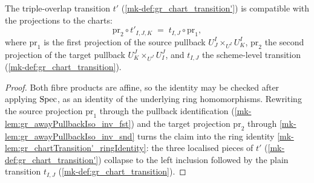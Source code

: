 \begin{lemma}\label{mk-lem:gr_chartTransition'_fac}
  \leanok

  The triple-overlap transition \(t'\) (\ref{mk-def:gr_chart_transition'}) is
  compatible with the projections to the charts:
  \[
    \mathrm{pr}_2 \circ t'_{I,J,K} \;=\; t_{I,J} \circ \mathrm{pr}_1 ,
  \]
  where \(\mathrm{pr}_1\) is the first projection of the source pullback
  \(U^I_J \times_{U^I} U^I_K\), \(\mathrm{pr}_2\) the second projection of the
  target pullback \(U^J_K \times_{U^J} U^J_I\), and \(t_{I,J}\) the scheme-level
  transition (\ref{mk-def:gr_chart_transition}).
\end{lemma}
\begin{proof}
  \leanok
  Both fibre products are affine, so the identity may be checked after applying
  \(\operatorname{Spec}\), as an identity of the underlying ring homomorphisms. Rewriting the
  source projection \(\mathrm{pr}_1\) through the pullback identification
  (\ref{mk-lem:gr_awayPullbackIso_inv_fst}) and the target projection
  \(\mathrm{pr}_2\) through \ref{mk-lem:gr_awayPullbackIso_inv_snd} turns the claim
  into the ring identity \ref{mk-lem:gr_chartTransition'_ringIdentity}: the three
  localised pieces of \(t'\) (\ref{mk-def:gr_chart_transition'}) collapse to the
  left inclusion followed by the plain transition \(t_{I,J}\)
  (\ref{mk-def:gr_chart_transition}).
\end{proof}

